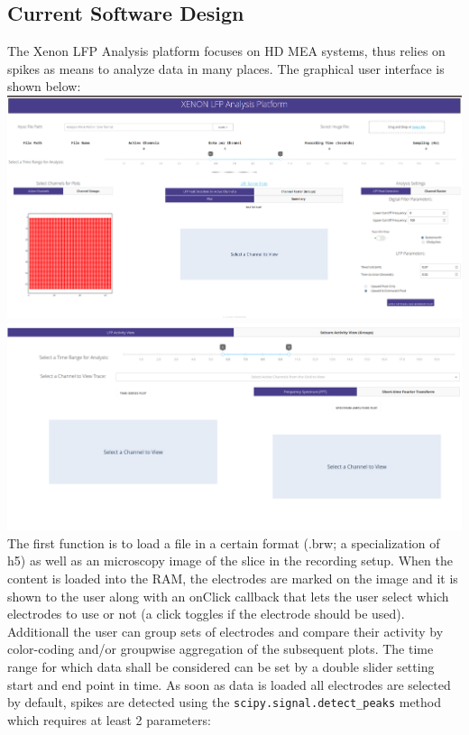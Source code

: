 \documentclass[a4paper]{article}
\begin{document}
	\subsection{Current Software Design}
        The Xenon LFP Analysis platform focuses on HD MEA systems, thus relies on spikes as means to analyze data in many places.
        The graphical user interface is shown below: \\
        \includegraphics[keepaspectratio,width=\textwidth]{img/xenon0.png} \\
        \includegraphics[keepaspectratio,width=\textwidth]{img/xenon1.png} \\
        The first function is to load a file in a certain format (.brw; a specialization of h5) as well as an microscopy image of the slice in the recording setup. 
        When the content is loaded into the RAM, the electrodes are marked on the image and it is shown to the user along with an onClick callback that lets the user select which electrodes to use or not (a click toggles if the electrode should be used).
        Additionall the user can group sets of electrodes and compare their activity by color-coding and/or groupwise aggregation of the subsequent plots.
        The time range for which data shall be considered can be set by a double slider setting start and end point in time.
        As soon as data is loaded all electrodes are selected by default, spikes are detected using the \texttt{scipy.signal.detect\_peaks} method which requires at least 2 parameters: 
\end{document}
